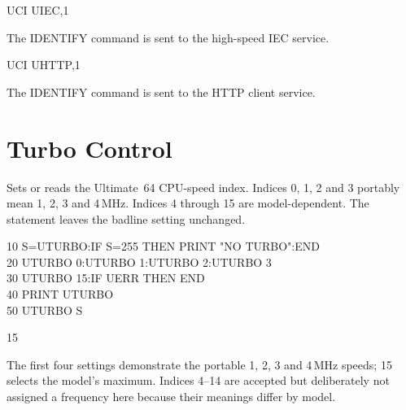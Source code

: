 \begin{referencechapter}
\begin{screen}
UCI UIEC,1
\end{screen}
\begin{resultbox}
The IDENTIFY command is sent to the high-speed IEC service.
\end{resultbox}

\begin{screen}
UCI UHTTP,1
\end{screen}
\begin{resultbox}
The IDENTIFY command is sent to the HTTP client service.
\end{resultbox}

\section{Turbo Control}




Sets or reads the Ultimate~64 CPU-speed index. Indices 0, 1, 2 and 3 portably
mean 1, 2, 3 and 4\,MHz. Indices 4 through 15 are model-dependent. The
statement leaves the badline setting unchanged.

\begin{screen}
10 S=UTURBO:IF S=255 THEN PRINT "NO TURBO":END\\
20 UTURBO 0:UTURBO 1:UTURBO 2:UTURBO 3\\
30 UTURBO 15:IF UERR THEN END\\
40 PRINT UTURBO\\
50 UTURBO S
\end{screen}

\begin{outputbox}
 15
\end{outputbox}

The first four settings demonstrate the portable 1, 2, 3 and 4\,MHz speeds;
15 selects the model's maximum. Indices 4--14 are accepted but deliberately
not assigned a frequency here because their meanings differ by model.


\end{referencechapter}
